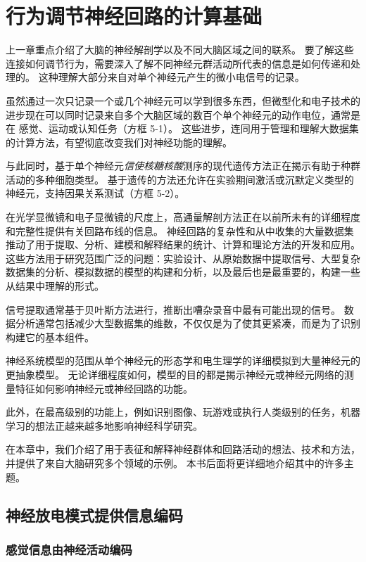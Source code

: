 \chapter{行为调节神经回路的计算基础} \label{chap:chap5}

上一章重点介绍了大脑的神经解剖学以及不同大脑区域之间的联系。
要了解这些连接如何调节行为，需要深入了解不同神经元群活动所代表的信息是如何传递和处理的。
这种理解大部分来自对单个神经元产生的微小电信号的记录。


虽然通过一次只记录一个或几个神经元可以学到很多东西，但微型化和电子技术的进步现在可以同时记录来自多个大脑区域的数百个单个神经元的动作电位，通常是在 感觉、运动或认知任务（方框 5-1）。 
这些进步，连同用于管理和理解大数据集的计算方法，有望彻底改变我们对神经功能的理解。


与此同时，基于单个神经元\textit{信使核糖核酸}测序的现代遗传方法正在揭示有助于种群活动的多种细胞类型。
基于遗传的方法还允许在实验期间激活或沉默定义类型的神经元，支持因果关系测试（方框 5-2）。


在光学显微镜和电子显微镜的尺度上，高通量解剖方法正在以前所未有的详细程度和完整性提供有关回路布线的信息。
神经回路的复杂性和从中收集的大量数据集推动了用于提取、分析、建模和解释结果的统计、计算和理论方法的开发和应用。
这些方法用于研究范围广泛的问题：实验设计、从原始数据中提取信号、大型复杂数据集的分析、模拟数据的模型的构建和分析，以及最后也是最重要的，构建一些 从结果中理解的形式。


信号提取通常基于贝叶斯方法进行，推断出嘈杂录音中最有可能出现的信号。
数据分析通常包括减少大型数据集的维数，不仅仅是为了使其更紧凑，而是为了识别构建它的基本组件。


神经系统模型的范围从单个神经元的形态学和电生理学的详细模拟到大量神经元的更抽象模型。
无论详细程度如何，模型的目的都是揭示神经元或神经元网络的测量特征如何影响神经元或神经回路的功能。

此外，在最高级别的功能上，例如识别图像、玩游戏或执行人类级别的任务，机器学习的想法正越来越多地影响神经科学研究。


在本章中，我们介绍了用于表征和解释神经群体和回路活动的想法、技术和方法，并提供了来自大脑研究多个领域的示例。
本书后面将更详细地介绍其中的许多主题。



\section{神经放电模式提供信息编码}

\subsection{感觉信息由神经活动编码}

